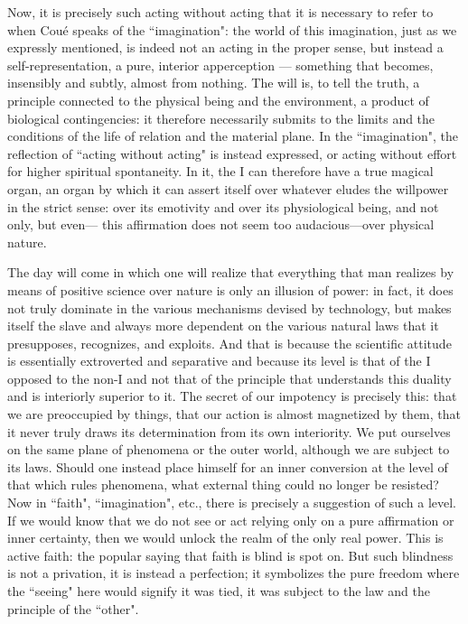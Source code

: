 Now, it is precisely such acting without acting that it is necessary to refer to when Coué speaks of the ``imagination": the world of this imagination, just as we expressly mentioned, is indeed not an acting in the proper sense, but instead a self-representation, a pure, interior apperception — something that becomes, insensibly and subtly, almost from nothing. The will is, to tell the truth, a principle connected to the physical being and the environment, a product of biological contingencies: it therefore necessarily submits to the limits and the conditions of the life of relation and the material plane. In the ``imagination", the reflection of ``acting without acting" is instead expressed, or acting without effort for higher spiritual spontaneity. In it, the I can therefore have a true magical organ, an organ by which it can assert itself over whatever eludes the willpower in the strict sense: over its emotivity and over its physiological being, and not only, but even— this affirmation does not seem too audacious—over physical nature.

The day will come in which one will realize that everything that man realizes by means of positive science over nature is only an illusion of power: in fact, it does not truly dominate in the various mechanisms devised by technology, but makes itself the slave and always more dependent on the various natural laws that it presupposes, recognizes, and exploits. And that is because the scientific attitude is essentially extroverted and separative and because its level is that of the I opposed to the non-I and not that of the principle that understands this duality and is interiorly superior to it. The secret of our impotency is precisely this: that we are preoccupied by things, that our action is almost magnetized by them, that it never truly draws its determination from its own interiority. We put ourselves on the same plane of phenomena or the outer world, although we are subject to its laws. Should one instead place himself for an inner conversion at the level of that which rules phenomena, what external thing could no longer be resisted? Now in ``faith", ``imagination", etc., there is precisely a suggestion of such a level. If we would know that we do not see or act relying only on a pure affirmation or inner certainty, then we would unlock the realm of the only real power. This is active faith: the popular saying that faith is blind is spot on. But such blindness is not a privation, it is instead a perfection; it symbolizes the pure freedom where the ``seeing" here would signify it was tied, it was subject to the law and the principle of the ``other".

